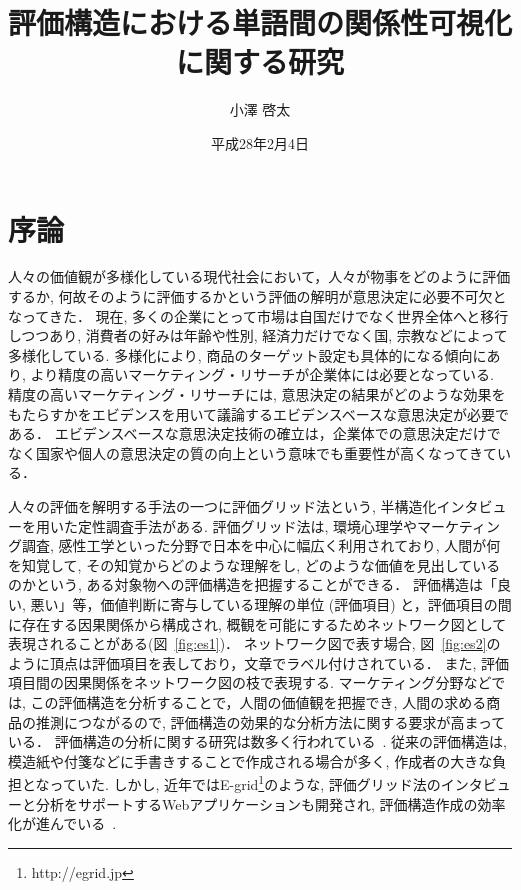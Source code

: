 \documentclass[syuuron]{kuee}
\title{評価構造における単語間の関係性可視化に関する研究}
\author{小澤 啓太}
\date{平成28年2月4日}
\begin{document}
\maketitle
\tableofcontents


\chapter{序論}
	人々の価値観が多様化している現代社会において，人々が物事をどのように評価するか, 
	何故そのように評価するかという評価の解明が意思決定に必要不可欠となってきた．
	現在, 多くの企業にとって市場は自国だけでなく世界全体へと移行しつつあり, 
	消費者の好みは年齢や性別, 経済力だけでなく国, 宗教などによって多様化している. 
	多様化により, 商品のターゲット設定も具体的になる傾向にあり, より精度の高いマーケティング・リサーチが企業体には必要となっている. 
	精度の高いマーケティング・リサーチには, 意思決定の結果がどのような効果をもたらすかをエビデンスを用いて議論するエビデンスベースな意思決定が必要である．
	エビデンスベースな意思決定技術の確立は，企業体での意思決定だけでなく国家や個人の意思決定の質の向上という意味でも重要性が高くなってきている．
	
	人々の評価を解明する手法の一つに評価グリッド法という, 半構造化インタビューを用いた定性調査手法がある. 
	評価グリッド法は, 環境心理学やマーケティング調査, 感性工学といった分野で日本を中心に幅広く利用されており, 
	人間が何を知覚して, その知覚からどのような理解をし, どのような価値を見出しているのかという, ある対象物への評価構造を把握することができる．
	評価構造は「良い, 悪い」等，価値判断に寄与している理解の単位 (評価項目) と，評価項目の間に存在する因果関係から構成され, 
	概観を可能にするためネットワーク図として表現されることがある(図~\ref{fig:es1})．
	ネットワーク図で表す場合, 図~\ref{fig:es2}のように頂点は評価項目を表しており，文章でラベル付けされている．
	また, 評価項目間の因果関係をネットワーク図の枝で表現する. 
	マーケティング分野などでは, この評価構造を分析することで，人間の価値観を把握でき, 人間の求める商品の推測につながるので, 
	評価構造の効果的な分析方法に関する要求が高まっている\cite{egm6, egm7}．
	評価構造の分析に関する研究は数多く行われている~\cite{egm8, egm9}. 
	従来の評価構造は, 模造紙や付箋などに手書きすることで作成される場合が多く, 作成者の大きな負担となっていた. 
	しかし, 近年ではE-grid\footnote{http://egrid.jp}のような, 評価グリッド法のインタビューと分析をサポートするWebアプリケーションも開発され, 評価構造作成の効率化が進んでいる~\cite{egm5, egm6, egm10}. 
	
\end{document}
